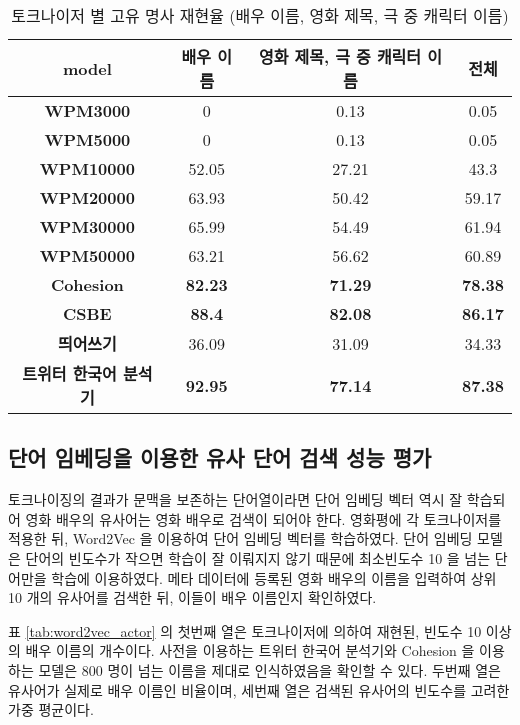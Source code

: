 \documentclass[oneside, ko,phd]{snuthesis_utf8_kor}
\begin{document}
\begin{table}[ht]
\centering
\caption{토크나이저 별 고유 명사 재현율 (배우 이름, 영화 제목, 극 중 캐릭터 이름)}
\label{tab:metamatching}
\begin{tabular}{|
>{}c |c|c|c|}
\hline
\textbf{model} & \textbf{배우 이름} & \textbf{영화 제목, 극 중 캐릭터 이름} & \textbf{전체} \\ \hline
\textbf{WPM3000} & 0 & 0.13 & 0.05 \\ \hline
\textbf{WPM5000} & 0 & 0.13 & 0.05 \\ \hline
\textbf{WPM10000} & 52.05 & 27.21 & 43.3 \\ \hline
\textbf{WPM20000} & 63.93 & 50.42 & 59.17 \\ \hline
\textbf{WPM30000} & 65.99 & 54.49 & 61.94 \\ \hline
\textbf{WPM50000} & 63.21 & 56.62 & 60.89 \\ \hline
\textbf{Cohesion} & {\textbf{82.23}} & {\textbf{71.29}} & {\textbf{78.38}} \\ \hline
\textbf{CSBE} & {\textbf{88.4}} & {\textbf{82.08}} & {\textbf{86.17}} \\ \hline
\textbf{띄어쓰기} & 36.09 & 31.09 & 34.33 \\ \hline
\textbf{트위터 한국어 분석기} & {\textbf{92.95}} & {\textbf{77.14}} & {\textbf{87.38}} \\ \hline
\end{tabular}%
\end{table}

\subsection{단어 임베딩을 이용한 유사 단어 검색 성능 평가}
토크나이징의 결과가 문맥을 보존하는 단어열이라면 단어 임베딩 벡터 역시 잘 학습되어 영화 배우의 유사어는 영화 배우로 검색이 되어야 한다.
영화평에 각 토크나이저를 적용한 뒤, Word2Vec \cite{mikolov2013efficient} 을 이용하여 단어 임베딩 벡터를 학습하였다.
단어 임베딩 모델은 단어의 빈도수가 작으면 학습이 잘 이뤄지지 않기 때문에 최소빈도수 10 을 넘는 단어만을 학습에 이용하였다.
메타 데이터에 등록된 영화 배우의 이름을 입력하여 상위 10 개의 유사어를 검색한 뒤, 이들이 배우 이름인지 확인하였다.

표 \ref{tab:word2vec_actor} 의 첫번째 열은 토크나이저에 의하여 재현된, 빈도수 10 이상의 배우 이름의 개수이다.
사전을 이용하는 트위터 한국어 분석기와 Cohesion 을 이용하는 모델은 800 명이 넘는 이름을 제대로 인식하였음을 확인할 수 있다.
두번째 열은 유사어가 실제로 배우 이름인 비율이며, 세번째 열은 검색된 유사어의 빈도수를 고려한 가중 평균이다.
\end{document}
